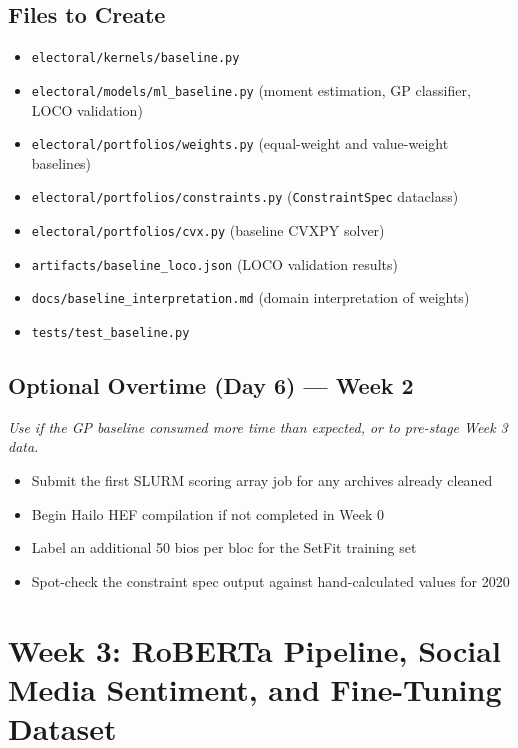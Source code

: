 \documentclass[11pt]{article}
\begin{document}
\subsection*{Files to Create}

\begin{itemize}[leftmargin=1.6em, itemsep=2pt]
  \item \texttt{electoral/kernels/baseline.py}
  \item \texttt{electoral/models/ml\_baseline.py} (moment estimation, GP classifier,
        LOCO validation)
  \item \texttt{electoral/portfolios/weights.py} (equal-weight and value-weight baselines)
  \item \texttt{electoral/portfolios/constraints.py} (\texttt{ConstraintSpec} dataclass)
  \item \texttt{electoral/portfolios/cvx.py} (baseline CVXPY solver)
  \item \texttt{artifacts/baseline\_loco.json} (LOCO validation results)
  \item \texttt{docs/baseline\_interpretation.md} (domain interpretation of weights)
  \item \texttt{tests/test\_baseline.py}
\end{itemize}

\subsection*{Optional Overtime (Day 6) --- Week 2}
\textit{Use if the GP baseline consumed more time than expected, or to pre-stage Week 3 data.}
\begin{itemize}[leftmargin=1.6em, itemsep=2pt]
  \item Submit the first SLURM scoring array job for any archives already cleaned
  \item Begin Hailo HEF compilation if not completed in Week 0
  \item Label an additional 50 bios per bloc for the SetFit training set
  \item Spot-check the constraint spec output against hand-calculated values for 2020
\end{itemize}

\section{Week 3: RoBERTa Pipeline, Social Media Sentiment, and Fine-Tuning Dataset}
\end{document}

